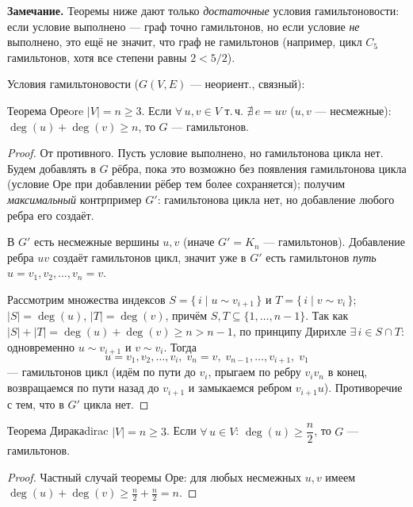 \medskip
\textbf{Замечание.} Теоремы ниже дают только \emph{достаточные} условия
гамильтоновости: если условие выполнено --- граф точно гамильтонов, но если
условие \emph{не} выполнено, это ещё не значит, что граф не гамильтонов
(например, цикл $C_5$ гамильтонов, хотя все степени равны $2 < 5/2$).

\medskip
Условия гамильтоновости ($G(V,E)$ --- неориент., связный):

\begin{statement}{Теорема Оре}{ore}
$|V| = n \ge 3$. Если $\forall\, u, v \in V$ т.\,ч. $\nexists\, e = uv$
\textup{($u, v$ --- несмежные)}:
$\deg(u) + \deg(v) \geq n$,
то $G$ --- гамильтонов.
\end{statement}

\begin{proof}
От противного. Пусть условие выполнено, но гамильтонова цикла нет. Будем
добавлять в $G$ рёбра, пока это возможно без появления гамильтонова цикла
(условие Оре при добавлении рёбер тем более сохраняется); получим
\emph{максимальный} контрпример $G'$: гамильтонова цикла нет, но
добавление любого ребра его создаёт.

В $G'$ есть несмежные вершины $u, v$ (иначе $G' = K_n$ --- гамильтонов).
Добавление ребра $uv$ создаёт гамильтонов цикл, значит уже в $G'$ есть
гамильтонов \emph{путь} $u = v_1, v_2, \ldots, v_n = v$.

Рассмотрим множества индексов
$S = \{\, i \mid u \sim v_{i+1} \,\}$ и $T = \{\, i \mid v \sim v_i \,\}$;
$|S| = \deg(u)$, $|T| = \deg(v)$, причём $S, T \subseteq \{1, \dots, n-1\}$.
Так как $|S| + |T| = \deg(u) + \deg(v) \ge n > n - 1$, по принципу Дирихле
$\exists\, i \in S \cap T$: одновременно $u \sim v_{i+1}$ и $v \sim v_i$.
Тогда
\[
  u = v_1, v_2, \ldots, v_i,\; v_n = v,\; v_{n-1}, \ldots, v_{i+1},\; v_1
\]
--- гамильтонов цикл (идём по пути до $v_i$, прыгаем по ребру $v_i v_n$
в конец, возвращаемся по пути назад до $v_{i+1}$ и замыкаемся ребром
$v_{i+1} u$). Противоречие с тем, что в $G'$ цикла нет.
\end{proof}

\begin{statement}{Теорема Дирака}{dirac}
$|V| = n \ge 3$. Если $\forall\, u \in V$: $\deg(u) \geq \dfrac{n}{2}$,
то $G$ --- гамильтонов.
\end{statement}

\begin{proof}
Частный случай теоремы Оре: для любых несмежных $u, v$ имеем
$\deg(u) + \deg(v) \ge \frac{n}{2} + \frac{n}{2} = n$.
\end{proof}

